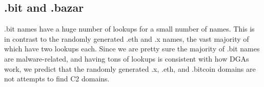 \subsection{.bit and .bazar}

.bit names have a huge number of lookups for a small number of names. This is 
in contrast to the randomly generated .eth and .x names, the vast majority of 
which have two lookups each. Since we are pretty sure the majority of .bit 
names are malware-related, and having tons of lookups is consistent with how 
DGAs work, we predict that the randomly generated .x, .eth, and .bitcoin 
domains are not attempts to find C2 domains.



%	
%	
